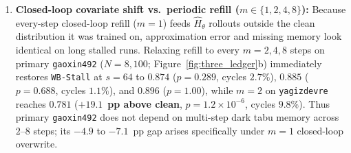\documentclass[10pt,letterpaper]{article}
\begin{document}
\begin{enumerate}[topsep=3pt,itemsep=2pt]
  \item \textbf{Closed-loop covariate shift vs.\ periodic refill ($m \in \{1,2,4,8\}$):} Because every-step closed-loop refill ($m=1$) feeds $\hat{H}_\theta$ rollouts outside the clean distribution it was trained on, approximation error and missing memory look identical on long stalled runs. Relaxing refill to every $m=2, 4, 8$ steps on primary \texttt{gaoxin492} ($N=8{,}100$; Figure~\ref{fig:three_ledger}b) immediately restores \texttt{WB-Stall} at $s=64$ to $\mathbf{0.874}$ ($p=0.289$, cycles $2.7\%$), $\mathbf{0.885}$ ($p=0.688$, cycles $1.1\%$), and $\mathbf{0.896}$ ($p=1.00$), while $m=2$ on \texttt{yagizdevre} reaches $\mathbf{0.781}$ ($\mathbf{+19.1}$~\textbf{pp above clean}, $p=1.2\times 10^{-6}$, cycles $9.8\%$). Thus primary \texttt{gaoxin492} does not depend on multi-step dark tabu memory across $2$--$8$ steps; its $-4.9$ to $-7.1$~pp gap arises specifically under $m=1$ closed-loop overwrite.
\end{enumerate}
\end{document}

